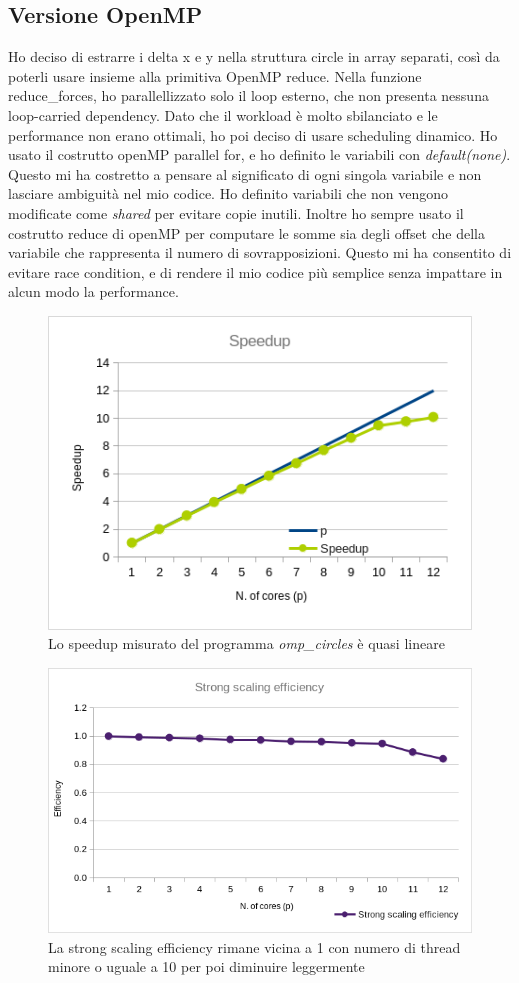 \documentclass[a4paper,11pt, twoside]{report}
\begin{document}
\subsection*{Versione OpenMP}
Ho deciso di estrarre i delta x e y nella struttura circle in array separati, così da poterli usare insieme alla primitiva OpenMP reduce.
Nella funzione reduce\_forces, ho parallellizzato solo il loop esterno, che non presenta nessuna loop-carried dependency.
Dato che il workload è molto sbilanciato e le performance non erano ottimali, ho poi deciso di usare scheduling dinamico.
Ho usato il costrutto openMP parallel for, e ho definito le variabili con \textit{default(none)}.
Questo mi ha costretto a pensare al significato di ogni singola variabile e non lasciare ambiguità nel mio codice.
Ho definito variabili che non vengono modificate come \textit{shared} per evitare copie inutili.
Inoltre ho sempre usato il costrutto reduce di openMP per computare le somme sia degli offset che della variabile che rappresenta il numero di sovrapposizioni.
Questo mi ha consentito di evitare race condition, e di rendere il mio codice più semplice senza impattare in alcun modo la performance.
\begin{figure}[H]
    \includegraphics[scale=0.5]{images/omp_speedup.png}
    \caption[]{Lo speedup misurato del programma \textit{omp\_circles} è quasi lineare}
\end{figure}
\begin{figure}[H]
    \includegraphics[scale=0.5]{images/omp_strong.png}
    \caption[]{La strong scaling efficiency rimane vicina a 1 con numero di thread minore o uguale a 10 per poi diminuire leggermente}
\end{figure}
\end{document}
